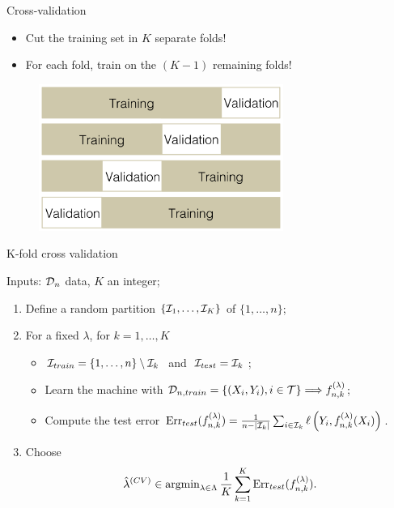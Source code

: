 \documentclass[xcolor={usenames,dvipsnames},handout]{beamer}
\begin{document}
\begin{frame}{Cross-validation}
\begin{itemize}
\item Cut the training set in $K$ separate folds!
\item  For each fold, train on the $(K-1)$ remaining folds!
\end{itemize}
\begin{figure}
\begin{center}
\includegraphics[width=8cm]{k-fold}
\end{center}
\end{figure}

\end{frame}

\begin{frame}{K-fold cross validation}


\begin{algorithm}[H]
Inputs: ${\mathcal{D}}_n$ data, $K$ an integer;
\begin{enumerate}
\item Define a random partition $\{{\mathcal{I}}_1,\hdots , {\mathcal{I}}_K\}$  of $\{1,\hdots , n\}$;
\item For a fixed $\lambda$, for $k=1,\hdots, K$
\begin{itemize}
\item ${\mathcal{I}}_{train} = \{1,\hdots , n \} \setminus {\mathcal{I}}_k \, \, $ and $\, \, {\mathcal{I}}_{test} = {\mathcal{I}}_k$ ; 
\item Learn the machine with ${\mathcal{D}}_{n,train} = \{ (X_i,Y_i), i \in {\mathcal{T}}\} \Longrightarrow f_{n,k}^{(\lambda)}$;
\item Compute the test error $\mathrm{Err}_{test} ( f_{n,k}^{(\lambda)} ) = \frac{1}{ n- | {\mathcal{I}}_k |} \sum_{i \in  {\mathcal{I}}_k} \ell \left( Y_i , f_{n,k}^{(\lambda)}( X_i ) \right)$.
\end{itemize}
\item Choose
$$\hat{\lambda}^{(CV)} \in \operatorname{argmin}_{\lambda \in \Lambda} \frac{1}{K} \sum_{k=1}^K \mathrm{Err}_{test} ( f_{n,k}^{(\lambda)} ).
$$
\end{enumerate} 
\caption{K-fold CV}
\end{algorithm}


\end{frame}
 
\end{document}
